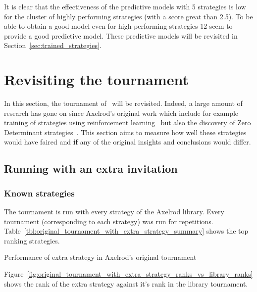 \documentclass{article}
\begin{document}
It is clear that the effectiveness of the predictive models with 5 strategies is
low for the cluster of highly performing strategies (with a score great than
2.5). To be able to obtain a good model even for high performing strategies 12
seem to provide a good predictive model. These predictive models will be
revisited in Section~\ref{sec:trained_strategies}.

\section{Revisiting the tournament}\label{sec:revisiting}

In this section, the tournament of~\cite{Axelrod1980b} will be revisited.
Indeed, a large amount of research has gone on since Axelrod's original work
which include for example training of strategies using reinforcement
learning~\cite{Harper2017}
but also the discovery of Zero Determinant strategies~\cite{Press2012}. This
section aims to measure how well these strategies would have faired and
\textbf{if} any of the original insights and conclusions would differ.

\subsection{Running with an extra invitation}\label{sec:extra_strategy}

\subsubsection{Known strategies}

The tournament is run with every strategy of the Axelrod library.
Every tournament (corresponding to each strategy) was run
for repetitions.
Table~\ref{tbl:original_tournament_with_extra_strategy_summary} shows the top
ranking strategies.

\begin{table}[!hbtp]
        \tiny
        \centering
        
        \caption{Performance of extra strategy in Axelrod's original tournament}
        \label{tbl:original_tournament_with_extra_strategy_summary}
\end{table}

Figure~\ref{fig:original_tournament_with_extra_strategy_ranks_vs_library_ranks}
shows the rank of the extra strategy against it's rank in the library
tournament.
\end{document}

